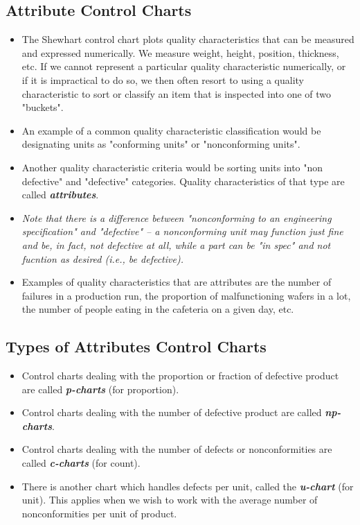 \documentclass[]{article}
\begin{document}
\newpage

\subsection{Attribute Control Charts}

\begin{itemize}
\item The Shewhart control chart plots quality characteristics that can be measured and expressed numerically. We measure weight, height, position, thickness, etc. If we cannot represent a particular quality characteristic numerically, or if it is impractical to do so, we then often resort to using a quality characteristic to sort or classify an item that is inspected into one of two "buckets".
\item  An example of a common quality characteristic classification would be designating units as "conforming units" or "nonconforming units". 
\item Another quality characteristic criteria would be sorting units into "non defective" and "defective" categories. Quality characteristics of that type are called \textit{\textbf{attributes}}.

\item \textit{Note that there is a difference between "nonconforming to an engineering specification" and "defective" -- a nonconforming unit may function just fine and be, in fact, not defective at all, while a part can be "in spec" and not fucntion as desired (i.e., be defective).}

\item Examples of quality characteristics that are attributes are the number of failures in a production run, the proportion of malfunctioning wafers in a lot, the number of people eating in the cafeteria on a given day, etc.
\end{itemize}
\subsection{Types of Attributes Control Charts}

\begin{itemize}
\item Control charts dealing with the proportion or fraction of defective product are called  \textbf{\textit{p-charts}} (for proportion).
\item Control charts dealing with the number of defective product are called  \textbf{\textit{np-charts}}.
\item Control charts dealing with the number of defects or nonconformities are called \textbf{\textit{c-charts}} (for count).
\item There is another chart which handles defects per unit, called the \textbf{\textit{u-chart}} (for unit). This applies when we wish to work with the average number of nonconformities per unit of product.
\end{itemize}
\end{document}
